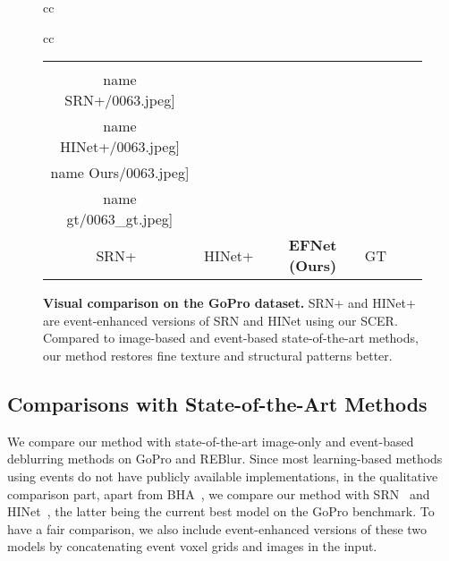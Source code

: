 \documentclass[runningheads]{llncs}
\newcommand{\name}{0}
\newcommand{\h}{0}
\newcommand{\w}{0.15}
\newlength \g
\begin{document}
\begin{figure*}[tb]
{\begin{tabular}{cc}
\begin{tabular}{cc}
\begin{adjustbox}{valign=t}
\begin{tabular}{cccccc}
						\texttt{[image: \\name SRN+/0063.jpeg]} \hspace{\g} &
						\texttt{[image: \\name HINet+/0063.jpeg]} \hspace{\g} &
						\texttt{[image: \\name Ours/0063.jpeg]}
						\hspace{\g} &		
						\texttt{[image: \\name gt/0063\_gt.jpeg]} 
						\\ 
						
						SRN+~\cite{tao2018scale} & HINet+~\cite{chen2021hinet}  & \textbf{EFNet (Ours)}   & GT
						\\
					\end{tabular}
				\end{adjustbox}
			\end{tabular}
			
\end{tabular}
	}
	
	\vspace{-3mm}
	\caption{\textbf{Visual comparison on the GoPro dataset.} SRN+ and HINet+ are event-enhanced versions of SRN and HINet using our SCER. Compared to image-based and event-based state-of-the-art methods, our method restores fine texture and structural patterns better.}
\label{fig:qualitative_gopro}
\end{figure*}

\subsection{Comparisons with State-of-the-Art Methods}

We compare our method with state-of-the-art image-only and event-based deblurring methods on GoPro and REBlur. Since most learning-based methods using events do not have publicly available implementations, in the qualitative comparison part, apart from BHA~\cite{pan2019bringing_high_framerate}, we compare our method with SRN~\cite{tao2018scale} and HINet~\cite{chen2021hinet}, the latter being the current best model on the GoPro benchmark. To have a fair comparison, we also include event-enhanced versions of these two models by concatenating event voxel grids and images in the input.
\end{document}
